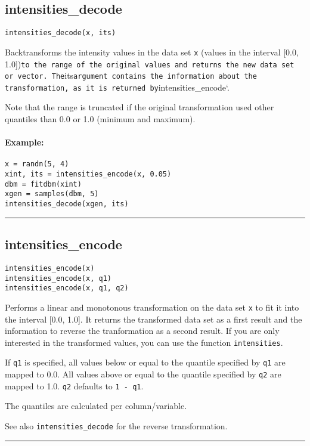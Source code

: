 \subsection*{intensities\_decode}
\begin{verbatim}
intensities_decode(x, its)
\end{verbatim}
Backtransforms the intensity values in the data set \texttt{x} (values in the interval [0.0, 1.0])\texttt{to the range of the original values and returns the new data set or vector. The}its\texttt{argument contains the information about the transformation, as it is returned by}intensities\_encode`.

Note that the range is truncated if the original transformation used other quantiles than 0.0 or 1.0 (minimum and maximum).

\paragraph*{Example:}
\begin{verbatim}
x = randn(5, 4)
xint, its = intensities_encode(x, 0.05)
dbm = fitdbm(xint)
xgen = samples(dbm, 5)
intensities_decode(xgen, its)
\end{verbatim}
\noindent\rule{\textwidth}{1pt}
\subsection*{intensities\_encode}
\begin{verbatim}
intensities_encode(x)
intensities_encode(x, q1)
intensities_encode(x, q1, q2)
\end{verbatim}
Performs a linear and monotonous transformation on the data set \texttt{x} to fit it into the interval [0.0, 1.0]. It returns the transformed data set as a first result and the information to reverse the tranformation as a second result. If you are only interested in the transformed values, you can use the function \texttt{intensities}.

If \texttt{q1} is specified, all values below or equal to the quantile specified  by \texttt{q1} are mapped to 0.0. All values above or equal to the quantile specified by \texttt{q2} are mapped to 1.0. \texttt{q2} defaults to \texttt{1 - q1}.

The quantiles are calculated per column/variable.

See also \texttt{intensities\_decode} for the reverse transformation.

\noindent\rule{\textwidth}{1pt}

